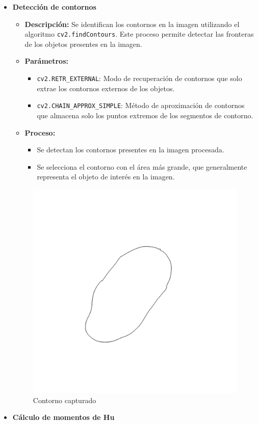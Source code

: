\documentclass[12pt,a4paper]{article}
\begin{document}
\begin{itemize}
    \item \textbf{Detección de contornos}
    \begin{itemize}
        \item \textbf{Descripción:} Se identifican los contornos en la imagen utilizando el algoritmo \texttt{cv2.findContours}. Este proceso permite detectar las fronteras de los objetos presentes en la imagen.
        \item \textbf{Parámetros:}
        \begin{itemize}
            \item \texttt{cv2.RETR\_EXTERNAL}: Modo de recuperación de contornos que solo extrae los contornos externos de los objetos.
            \item \texttt{cv2.CHAIN\_APPROX\_SIMPLE}: Método de aproximación de contornos que almacena solo los puntos extremos de los segmentos de contorno.
        \end{itemize}
        \item \textbf{Proceso:} 
        \begin{itemize}
            \item Se detectan los contornos presentes en la imagen procesada.
            \item Se selecciona el contorno con el área más grande, que generalmente representa el objeto de interés en la imagen.
        \end{itemize}
    \end{itemize}
\begin{figure}[h]
    \centering
    \includegraphics[width=0.5\linewidth]{Imagen_con_contornos_20241129_095157.png}
    \caption{Contorno capturado}
    \label{fig:enter-label}
\end{figure}
    \item \textbf{Cálculo de momentos de Hu}
    \begin{itemize}

\end{itemize}
\end{itemize}
\end{document}
